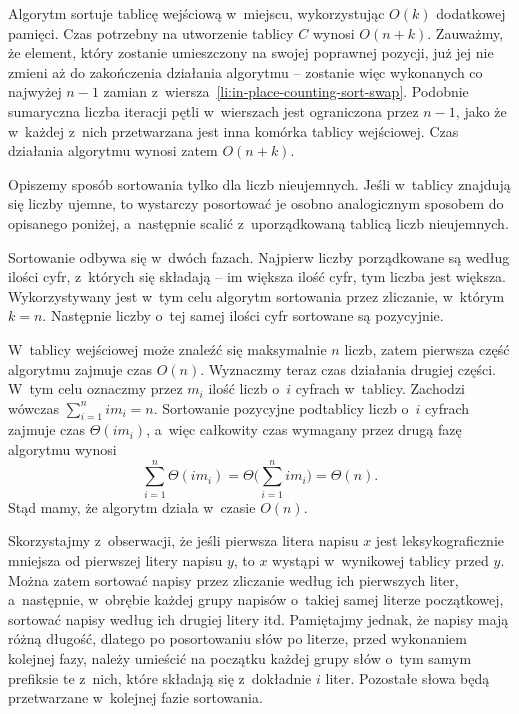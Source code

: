 Algorytm sortuje tablicę wejściową w~miejscu, wykorzystując $O(k)$ dodatkowej pamięci. Czas potrzebny na utworzenie tablicy $C$ wynosi $O(n+k)$. Zauważmy, że element, który zostanie umieszczony na swojej poprawnej pozycji, już jej nie zmieni aż do zakończenia działania algorytmu -- zostanie więc wykonanych co najwyżej $n-1$ zamian z~wiersza~\ref{li:in-place-counting-sort-swap}. Podobnie sumaryczna liczba iteracji pętli  w~wierszach \twodashes{\ref{li:in-place-counting-sort-while1-begin}}{\ref{li:in-place-counting-sort-while1-end}} jest ograniczona przez $n-1$, jako że w~każdej z~nich przetwarzana jest inna komórka tablicy wejściowej. Czas działania algorytmu wynosi zatem $O(n+k)$.


\subproblem %
Opiszemy sposób sortowania tylko dla liczb nieujemnych. Jeśli w~tablicy znajdują się liczby ujemne, to wystarczy posortować je osobno analogicznym sposobem do opisanego poniżej, a~następnie scalić z~uporządkowaną tablicą liczb nieujemnych.

Sortowanie odbywa się w~dwóch fazach. Najpierw liczby porządkowane są według ilości cyfr, z~których się składają -- im większa ilość cyfr, tym liczba jest większa. Wykorzystywany jest w~tym celu algorytm sortowania przez zliczanie, w~którym $k=n$. Następnie liczby o~tej samej ilości cyfr sortowane są pozycyjnie.

W~tablicy wejściowej może znaleźć się maksymalnie $n$ liczb, zatem pierwsza część algorytmu zajmuje czas $O(n)$. Wyznaczmy teraz czas działania drugiej części. W~tym celu oznaczmy przez $m_i$ ilość liczb o~$i$ cyfrach w~tablicy. Zachodzi wówczas $\sum_{i=1}^nim_i=n$. Sortowanie pozycyjne podtablicy liczb o~$i$ cyfrach zajmuje czas $\Theta(im_i)$, a~więc całkowity czas wymagany przez drugą fazę algorytmu wynosi
\[
    \sum_{i=1}^n\Theta(im_i) = \Theta\biggl(\sum_{i=1}^nim_i\biggr) = \Theta(n).
\]
Stąd mamy, że algorytm działa w~czasie $O(n)$.

\subproblem %
Skorzystajmy z~obserwacji, że jeśli pierwsza litera napisu $x$ jest leksykograficznie mniejsza od pierwszej litery napisu $y$, to $x$ wystąpi w~wynikowej tablicy przed $y$. Można zatem sortować napisy przez zliczanie według ich pierwszych liter, a~następnie, w~obrębie każdej grupy napisów o~takiej samej literze początkowej, sortować napisy według ich drugiej litery itd. Pamiętajmy jednak, że napisy mają różną długość, dlatego po posortowaniu słów po  literze, przed wykonaniem kolejnej fazy, należy umieścić na początku każdej grupy słów o~tym samym prefiksie  te z~nich, które składają się z~dokładnie $i$ liter. Pozostałe słowa będą przetwarzane w~kolejnej fazie sortowania.


